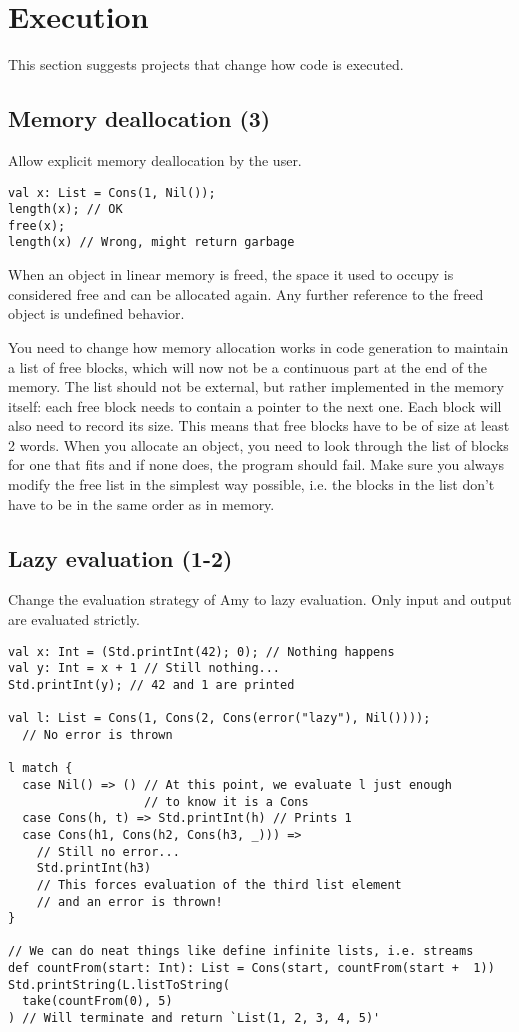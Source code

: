 \section{Execution}
This section suggests projects that change how \langname code is executed.

\subsection{Memory deallocation (3)}
Allow explicit memory deallocation by the user.
\begin{lstlisting}
val x: List = Cons(1, Nil());
length(x); // OK
free(x);
length(x) // Wrong, might return garbage
\end{lstlisting}

When an object in linear memory is freed, the space it used to occupy
is considered free and can be allocated again.
Any further reference to the freed object is undefined behavior.

You need to change how memory allocation works in code generation
to maintain a list of free blocks,
which will now not be a continuous part at the end of the memory.
The list should not be external,
but rather implemented in the memory itself:
each free block needs to contain a pointer to the next one.
Each block will also need to record its size.
This means that free blocks have to be of size at least 2 words.
When you allocate an object, you need to look through the list
of blocks for one that fits and if none does,
the program should fail.
Make sure you always modify the free list in the simplest way possible,
i.e. the blocks in the list don't have to be in the same order as in memory.

\subsection{Lazy evaluation (1-2)}
Change the evaluation strategy of Amy to lazy evaluation.
Only input and output are evaluated strictly.

\begin{lstlisting}
val x: Int = (Std.printInt(42); 0); // Nothing happens
val y: Int = x + 1 // Still nothing...
Std.printInt(y); // 42 and 1 are printed

val l: List = Cons(1, Cons(2, Cons(error("lazy"), Nil())));
  // No error is thrown

l match {
  case Nil() => () // At this point, we evaluate l just enough
                   // to know it is a Cons
  case Cons(h, t) => Std.printInt(h) // Prints 1
  case Cons(h1, Cons(h2, Cons(h3, _))) =>
    // Still no error...
    Std.printInt(h3)
    // This forces evaluation of the third list element
    // and an error is thrown!
}

// We can do neat things like define infinite lists, i.e. streams
def countFrom(start: Int): List = Cons(start, countFrom(start +  1))
Std.printString(L.listToString(
  take(countFrom(0), 5)
) // Will terminate and return `List(1, 2, 3, 4, 5)'
\end{lstlisting}

